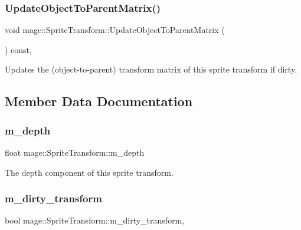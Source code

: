 \subsubsection{\texorpdfstring{Update\+Object\+To\+Parent\+Matrix()}{UpdateObjectToParentMatrix()}}
{\footnotesize\ttfamily void mage\+::\+Sprite\+Transform\+::\+Update\+Object\+To\+Parent\+Matrix (\begin{DoxyParamCaption}{ }\end{DoxyParamCaption}) const\hspace{0.3cm}{\ttfamily [private]}, {\ttfamily [noexcept]}}

Updates the (object-\/to-\/parent) transform matrix of this sprite transform if dirty. 

\subsection{Member Data Documentation}
\hypertarget{structmage_1_1_sprite_transform_a9a61159b9f52e5cc18c0f8cea378714c}{}\label{structmage_1_1_sprite_transform_a9a61159b9f52e5cc18c0f8cea378714c} 
\subsubsection{\texorpdfstring{m\+\_\+depth}{m\_depth}}
{\footnotesize\ttfamily float mage\+::\+Sprite\+Transform\+::m\+\_\+depth\hspace{0.3cm}{\ttfamily [private]}}

The depth component of this sprite transform. \hypertarget{structmage_1_1_sprite_transform_a3072ed606f16d14d16cdad46438e9cf3}{}\label{structmage_1_1_sprite_transform_a3072ed606f16d14d16cdad46438e9cf3} 
\subsubsection{\texorpdfstring{m\+\_\+dirty\+\_\+transform}{m\_dirty\_transform}}
{\footnotesize\ttfamily bool mage\+::\+Sprite\+Transform\+::m\+\_\+dirty\+\_\+transform\hspace{0.3cm}{\ttfamily [mutable]}, {\ttfamily [private]}}

